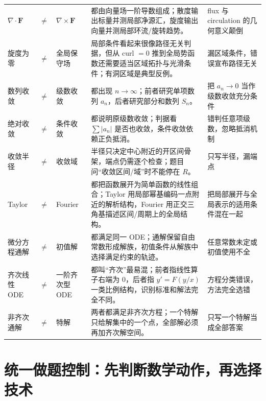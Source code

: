 \documentclass[11pt,a4paper,openany]{ctexbook}
\begin{document}
\begin{longtable}{L{1.8cm}@{}>{\centering\arraybackslash}p{0.35cm}@{}L{1.8cm}L{5.4cm}L{\dimexpr\linewidth-9.72cm\relax}}
$\nabla\cdot\bm F$ & $\neq$ & $\nabla\times\bm F$ & 都由向量场一阶导数组成；散度输出标量并测局部净源汇，旋度输出向量并测局部环流/旋转趋势。 & flux 与 circulation 的几何意义颠倒\\
旋度为零 & $\neq$ & 全局保守场 & 局部条件看起来很像路径无关判据，但从 curl $=0$ 推到全局势函数还需要适当区域拓扑与光滑条件；有洞区域是典型反例。 & 漏区域条件，错误宣布路径无关\\
数列收敛 & $\neq$ & 级数收敛 & 都出现 $n\to\infty$；前者研究单项数列 $a_n$，后者研究部分和数列 $S_n$。 & 把 $a_n\to0$ 当作级数收敛充分条件\\
绝对收敛 & $\neq$ & 条件收敛 & 都说明原级数收敛；判据看 $\sum\lvert a_n\rvert$ 是否也收敛，条件收敛依赖正负抵消。 & 错判任意项级数，忽略抵消机制\\
收敛半径 & $\neq$ & 收敛域 & 半径只决定中心附近的开区间骨架，端点仍需逐个检查；题目问“收敛区间/域”时不能停在 $R$。 & 只写半径，漏端点\\
Taylor & $\neq$ & Fourier & 都把函数展开为简单函数的线性组合；Taylor 用局部幂基编码一点附近的解析结构，Fourier 用正交三角基描述区间/周期上的全局结构。 & 把局部展开与全局表示的适用条件混在一起\\
微分方程通解 & $\neq$ & 初值解 & 都满足同一 ODE；通解保留自由常数形成解族，初值条件从解族中选择满足约束的轨迹。 & 任意常数未定或初值使用不全\\
齐次线性 ODE & $\neq$ & 一阶齐次型 ODE & 都叫“齐次”最易混；前者指线性算子右端为 0，后者指 $y'=F(y/x)$ 一类比例结构，识别标准和解法完全不同。 & 方程分类错误，方法完全选错\\
非齐次通解 & $\neq$ & 特解 & 两者都满足非齐次方程；一个特解只给解集中的一个点，全部解必须再加齐次解空间。 & 只写一个特解当成全部答案\\
\bottomrule
\end{longtable}

\chapter{统一做题控制：先判断数学动作，再选择技术}
\end{document}
